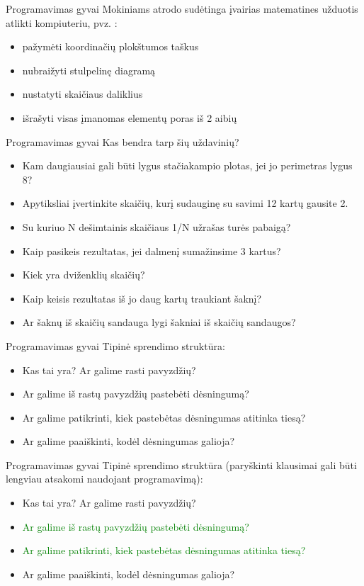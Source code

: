\documentclass{beamer}
\begin{document}
\begin{frame}[fragile]{Programavimas gyvai}
Mokiniams atrodo sudėtinga įvairias matematines užduotis atlikti kompiuteriu, pvz. :
\begin{itemize}
\item pažymėti koordinačių plokštumos taškus
\item nubraižyti stulpelinę diagramą
\item nustatyti skaičiaus daliklius
\item išrašyti visas įmanomas elementų poras iš 2 aibių
\end{itemize}
\end{frame}

\begin{frame}[fragile]{Programavimas gyvai}
Kas bendra tarp šių uždavinių?
\begin{itemize}
\item Kam daugiausiai gali būti lygus stačiakampio plotas, jei jo perimetras lygus 8?
\item Apytiksliai įvertinkite skaičių, kurį sudauginę su savimi 12 kartų gausite 2.
\item Su kuriuo N dešimtainis skaičiaus 1/N užrašas turės pabaigą?
\item Kaip pasikeis rezultatas, jei dalmenį sumažinsime 3 kartus?
\item Kiek yra dviženklių skaičių?
\item Kaip keisis rezultatas iš jo daug kartų traukiant šaknį?
\item Ar šaknų iš skaičių sandauga lygi šakniai iš skaičių sandaugos?
\end{itemize}
\end{frame}

\begin{frame}[fragile]{Programavimas gyvai}
Tipinė sprendimo struktūra:
\begin{itemize}
\item Kas tai yra? Ar galime rasti pavyzdžių?
\item Ar galime iš rastų pavyzdžių pastebėti dėsningumą?
\item Ar galime patikrinti, kiek pastebėtas dėsningumas atitinka tiesą?
\item Ar galime paaiškinti, kodėl dėsningumas galioja?
\end{itemize}
\end{frame}

\begin{frame}[fragile]{Programavimas gyvai}
Tipinė sprendimo struktūra (paryškinti klausimai gali būti lengviau atsakomi naudojant programavimą):
\begin{itemize}
\item Kas tai yra? Ar galime rasti pavyzdžių?
\item \textcolor{green}{Ar galime iš rastų pavyzdžių pastebėti dėsningumą?}
\item \textcolor{green}{Ar galime patikrinti, kiek pastebėtas dėsningumas atitinka tiesą?}
\item Ar galime paaiškinti, kodėl dėsningumas galioja?
\end{itemize}
\end{frame}
\end{document}
